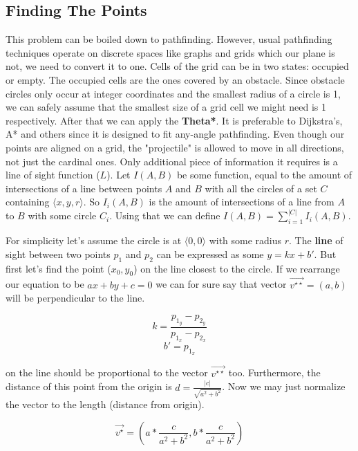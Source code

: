 \documentclass[12pt, titlepage]{article}
\begin{document}
\subsection{Finding The Points}
This problem can be boiled down to pathfinding. However, usual pathfinding
techniques operate on discrete spaces like graphs and grids which our plane
is not, we need to convert it to one. Cells of the grid can be in two states:
occupied or empty. The occupied cells are the ones covered by an obstacle. 
Since obstacle circles only occur at integer coordinates and the smallest
radius of a circle is 1, we can safely assume that the smallest size of a grid
cell we might need is 1 respectively. After that we can apply the \textbf{Theta*}.
It is preferable to Dijkstra's, A* and others since it is designed to fit
any-angle pathfinding. Even though our points are aligned on a grid,
the "projectile" is allowed to move in all directions, not just the cardinal ones. 
Only additional piece of information it requires is a line of sight function ($L$).
Let $I(A, B)$ be some function, equal to the amount of intersections of a 
line between points $A$ and $B$  with all the circles of a set $C$ containing 
$\langle x, y, r \rangle$. So $I_i(A, B)$ is the amount of intersections
of a line from $A$ to $B$ with some circle $C_i$. 
Using that we can define $I(A, B) = \sum_{i=1}^{|C|}I_i(A, B)$.

For simplicity let's assume the circle is at $\langle 0, 0 \rangle$ with
some radius $r$. The \textbf{line} of sight between two points $p_1$ and $p_2$
can be expressed as some $y = kx + b'$. 
But first let's find the point ($x_0, y_0$) on the line closest to the circle.
If we rearrange our equation to be $ax + by + c = 0$ we can for sure say that 
vector $\vec{v^{\star\star}} = (a, b)$ will be perpendicular to the line.

\begin{equation}
    k = \frac{p_{1_y} - p_{2_y}}{p_{1_x} - p_{2_x}}
\end{equation}
\begin{equation}
    b' = p_{1_x}
\end{equation}

on the line should be proportional to the vector $\vec{v^{\star\star}}$ too. 
Furthermore, the distance
of this point from the origin is $d = \frac{|c|}{\sqrt{a^2 + b^2}}$.
Now we may just normalize the vector to the length (distance from origin).

\begin{equation}
    \vec{v^\star}=\left(a * \frac{c}{a^2 + b^2}, b * \frac{c}{a^2 + b^2}\right)
\end{equation}
\end{document}
